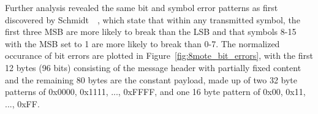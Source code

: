 Further analysis revealed the same bit and symbol error patterns as first discovered by Schmidt~\etal~\cite{Schmidt2013}, which state that within any transmitted symbol, the first three MSB are more likely to break than the LSB and that symbols 8-15 with the MSB set to 1 are more likely to break than 0-7.
The normalized occurance of bit errors are plotted in Figure~\ref{fig:8mote_bit_errors}, with the first 12 bytes (96 bits) consisting of the message header with partially fixed content and the remaining 80 bytes are the constant payload, made up of two 32 byte patterns of 0x0000, 0x1111, ..., 0xFFFF, and one 16 byte pattern of 0x00, 0x11, ..., 0xFF.

\begin{figure}[t]
\end{figure}
